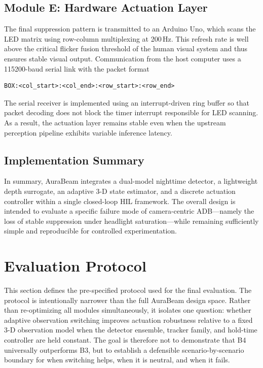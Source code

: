 \documentclass[pdflatex,sn-mathphys-num]{sn-jnl}%
\theoremstyle{thmstyleone}%
\theoremstyle{thmstyletwo}%
\theoremstyle{thmstylethree}%
\begin{document}
\subsection{Module E: Hardware Actuation Layer}
\label{subsec:hw}

The final suppression pattern is transmitted to an Arduino Uno, which scans the LED matrix using row-column multiplexing at 200\,Hz. This refresh rate is well above the critical flicker fusion threshold of the human visual system and thus ensures stable visual output. Communication from the host computer uses a 115200-baud serial link with the packet format

\begin{verbatim}
BOX:<col_start>:<col_end>:<row_start>:<row_end>
\end{verbatim}

The serial receiver is implemented using an interrupt-driven ring buffer so that packet decoding does not block the timer interrupt responsible for LED scanning. As a result, the actuation layer remains stable even when the upstream perception pipeline exhibits variable inference latency.

\subsection{Implementation Summary}
\label{subsec:implementation_summary}

In summary, AuraBeam integrates a dual-model nighttime detector, a lightweight depth surrogate, an adaptive 3-D state estimator, and a discrete actuation controller within a single closed-loop HIL framework. The overall design is intended to evaluate a specific failure mode of camera-centric ADB---namely the loss of stable suppression under headlight saturation---while remaining sufficiently simple and reproducible for controlled experimentation.

\section{Evaluation Protocol}
\label{sec:eval}
This section defines the pre-specified protocol used for the final
evaluation. The protocol is intentionally narrower than the full
AuraBeam design space. Rather than re-optimizing all modules simultaneously,
it isolates one question: whether adaptive observation switching
improves actuation robustness relative to a fixed 3-D observation model
when the detector ensemble, tracker family, and hold-time controller are
held constant. The goal is therefore not to demonstrate that B4 universally
outperforms B3, but to establish a defensible scenario-by-scenario
boundary for when switching helps, when it is neutral, and when it
fails.
\end{document}

